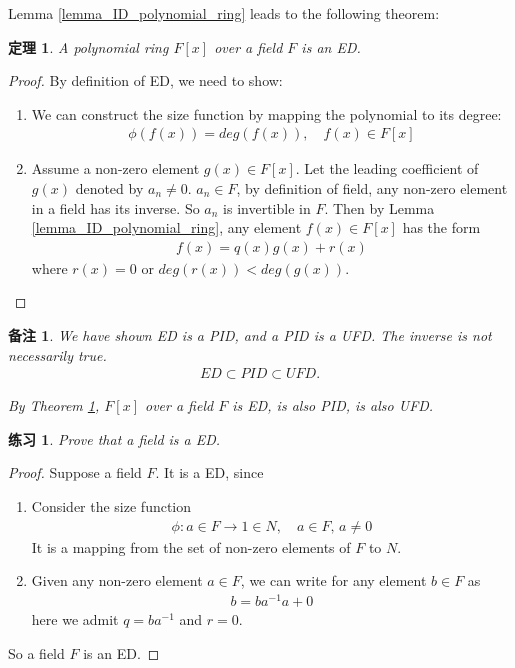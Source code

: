 \documentclass[utf8]{ctexbook}
\newtheorem{theorem}{定理}[section]
\newtheorem{memo}{备注}[section]
\newtheorem{exercise}{练习}[section]
\begin{document}
Lemma \ref{lemma_ID_polynomial_ring} leads to the following theorem:

\begin{theorem}
\label{theorem_Polynomial_ring_over_field_is_ED}
A polynomial ring $F[x]$ over a field $F$ is an ED.
\end{theorem}

\begin{proof}
By definition of ED, we need to show:
\begin{enumerate}
\item{We can construct the size function by mapping the polynomial to its degree:
\begin{align*}
\phi(f(x)) = deg(f(x)), \quad f(x) \in F[x]
\end{align*}
}
\item{
Assume a non-zero element $g(x) \in F[x]$. Let the leading coefficient of $g(x)$ denoted by $a_n \neq 0$. $a_n \in F$, by definition of field, any non-zero element in a field has its inverse. So $a_n$ is invertible in $F$. Then by Lemma \ref{lemma_ID_polynomial_ring}, any element $f(x) \in F[x]$ has the form
\begin{align*}
f(x) = q(x) g(x) + r(x)
\end{align*}
where $r(x) = 0$ or $deg(r(x)) < deg(g(x))$.
}
\end{enumerate}

\end{proof}

\begin{memo}
We have shown ED is a PID, and a PID is a UFD. The inverse is not necessarily true.
\begin{align*}
ED \subset PID \subset UFD .
\end{align*}

By Theorem \ref{theorem_Polynomial_ring_over_field_is_ED}, $F[x]$ over a field $F$ is ED, is also PID, is also UFD.

\end{memo}

\begin{exercise}
Prove that a field is a ED.
\end{exercise}

\begin{proof}
Suppose a field $F$. It is a ED, since
\begin{enumerate}
\item{
Consider the size function
\begin{align*}
\phi: a \in F \longrightarrow 1 \in N, \quad a \in F, \, a \neq 0
\end{align*}
It is a mapping from the set of non-zero elements of $F$ to $N$.
}
\item{
Given any non-zero element $a \in F$, we can write for any element $b \in F$ as
\begin{align*}
b = b a^{-1} a + 0
\end{align*}
here we admit $q = b a^{-1}$ and $r=0$.
}
\end{enumerate}

So a field $F$ is an ED.
\end{proof}
\end{document}
